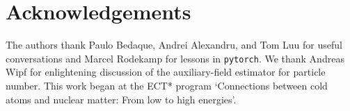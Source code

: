 \section*{Acknowledgements}

The authors thank Paulo Bedaque, Andrei Alexandru, and Tom Luu for useful conversations and Marcel Rodekamp for lessons in \texttt{pytorch}.
We thank Andreas Wipf for enlightening discussion of the auxiliary-field estimator for particle number.
This work began at the ECT* program `Connections between cold atoms and nuclear matter: From low to high energies'.
